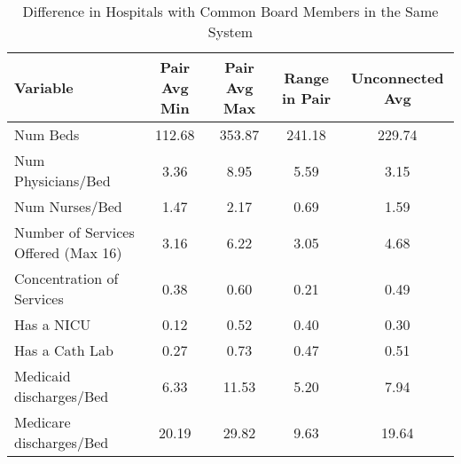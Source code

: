 \begin{table}[ht!]
\centering
\caption{Difference in Hospitals with Common Board Members in the Same System}
\centering
\begin{tabular}[t]{lcccc}
\toprule
Variable & Pair Avg Min & Pair Avg Max & Range in Pair & Unconnected Avg\\
\midrule
Num Beds & 112.68 & 353.87 & 241.18 & 229.74\\
Num Physicians/Bed & 3.36 & 8.95 & 5.59 & 3.15\\
Num Nurses/Bed & 1.47 & 2.17 & 0.69 & 1.59\\
Number of Services Offered (Max 16) & 3.16 & 6.22 & 3.05 & 4.68\\
Concentration of Services & 0.38 & 0.60 & 0.21 & 0.49\\
\addlinespace
Has a NICU & 0.12 & 0.52 & 0.40 & 0.30\\
Has a Cath Lab & 0.27 & 0.73 & 0.47 & 0.51\\
Medicaid discharges/Bed & 6.33 & 11.53 & 5.20 & 7.94\\
Medicare discharges/Bed & 20.19 & 29.82 & 9.63 & 19.64\\
\bottomrule
\end{tabular}
\end{table}
